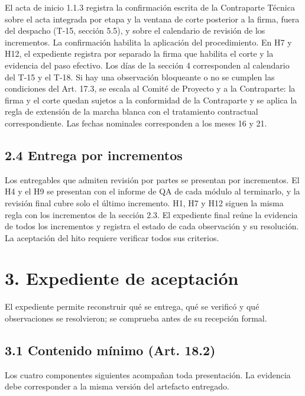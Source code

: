 El acta de inicio 1.1.3 registra la confirmación escrita de la Contraparte Técnica sobre el acta integrada por etapa y la ventana de corte posterior a la firma, fuera del despacho (T-15, sección 5.5), y sobre el calendario de revisión de los incrementos. La confirmación habilita la aplicación del procedimiento. En H7 y H12, el expediente registra por separado la firma que habilita el corte y la evidencia del paso efectivo. Los días de la sección 4 corresponden al calendario del T-15 y el T-18. Si hay una observación bloqueante o no se cumplen las condiciones del Art. 17.3, se escala al Comité de Proyecto y a la Contraparte: la firma y el corte quedan sujetos a la conformidad de la Contraparte y se aplica la regla de extensión de la marcha blanca con el tratamiento contractual correspondiente. Las fechas nominales corresponden a los meses 16 y 21.

\subsection*{2.4 Entrega por incrementos}

Los entregables que admiten revisión por partes se presentan por incrementos. El H4 y el H9 se presentan con el informe de QA de cada módulo al terminarlo, y la revisión final cubre solo el último incremento. H1, H7 y H12 siguen la misma regla con los incrementos de la sección 2.3. El expediente final reúne la evidencia de todos los incrementos y registra el estado de cada observación y su resolución. La aceptación del hito requiere verificar todos sus criterios.

\section*{3. Expediente de aceptación}

El expediente permite reconstruir qué se entrega, qué se verificó y qué observaciones se resolvieron; se comprueba antes de su recepción formal.

\subsection*{3.1 Contenido mínimo (Art. 18.2)}

Los cuatro componentes siguientes acompañan toda presentación. La evidencia debe corresponder a la misma versión del artefacto entregado.

